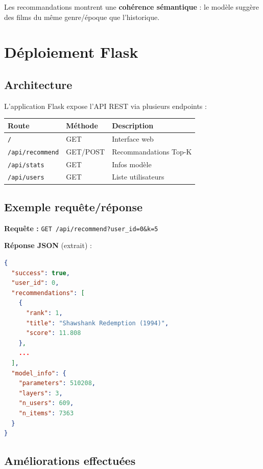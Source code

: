 \documentclass[12pt,a4paper]{report}
\begin{document}
Les recommandations montrent une \textbf{cohérence sémantique} : le modèle
suggère des films du même genre/époque que l'historique.

\chapter{Déploiement Flask}

\section{Architecture}

L'application Flask expose l'API REST via plusieurs endpoints :

\begin{center}
\begin{tabular}{lll}
\toprule
\textbf{Route} & \textbf{Méthode} & \textbf{Description} \\
\midrule
\texttt{/} & GET & Interface web \\
\texttt{/api/recommend} & GET/POST & Recommandations Top-K \\
\texttt{/api/stats} & GET & Infos modèle \\
\texttt{/api/users} & GET & Liste utilisateurs \\
\bottomrule
\end{tabular}
\end{center}

\section{Exemple requête/réponse}

\textbf{Requête :} \texttt{GET /api/recommend?user\_id=0\&k=5}

\textbf{Réponse JSON} (extrait) :

\begin{lstlisting}[language=json]
{
  "success": true,
  "user_id": 0,
  "recommendations": [
    {
      "rank": 1,
      "title": "Shawshank Redemption (1994)",
      "score": 11.808
    },
    ...
  ],
  "model_info": {
    "parameters": 510208,
    "layers": 3,
    "n_users": 609,
    "n_items": 7363
  }
}
\end{lstlisting}

\section{Améliorations effectuées}
\end{document}
